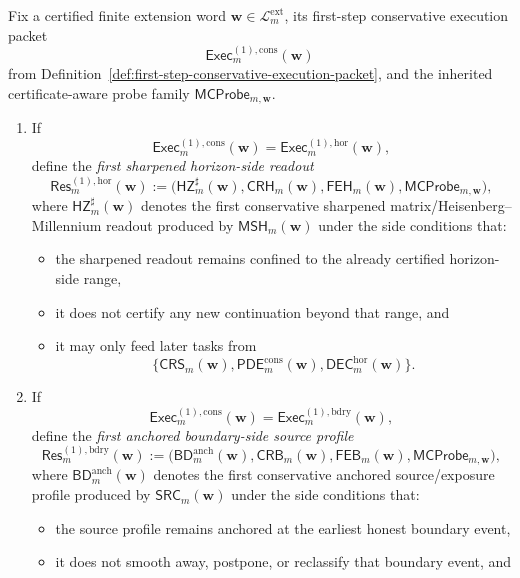 \begin{definition}
\label{def:first-conservative-result-form}
Fix a certified finite extension word \(\mathbf w\in\mathcal L^{\mathrm{ext}}_{m}\), its first-step conservative execution packet
\[
 \mathsf{Exec}^{(1),\mathrm{cons}}_{m}(\mathbf w)
\]
from Definition~\ref{def:first-step-conservative-execution-packet}, and the inherited certificate-aware probe family \(\mathsf{MCProbe}_{m,\mathbf w}\).
\begin{enumerate}[label=(\roman*)]
 \item If
 \[
 \mathsf{Exec}^{(1),\mathrm{cons}}_{m}(\mathbf w)=\mathsf{Exec}^{(1),\mathrm{hor}}_{m}(\mathbf w),
 \]
 define the \emph{first sharpened horizon-side readout}
 \[
 \mathsf{Res}^{(1),\mathrm{hor}}_{m}(\mathbf w)
 :=
 \bigl(\mathsf{HZ}^{\sharp}_{m}(\mathbf w),\mathsf{CRH}_{m}(\mathbf w),\mathsf{FEH}_{m}(\mathbf w),\mathsf{MCProbe}_{m,\mathbf w}\bigr),
 \]
 where \(\mathsf{HZ}^{\sharp}_{m}(\mathbf w)\) denotes the first conservative sharpened matrix/Heisenberg--Millennium readout produced by \(\mathsf{MSH}_{m}(\mathbf w)\) under the side conditions that:
 \begin{itemize}[leftmargin=2em]
 \item the sharpened readout remains confined to the already certified horizon-side range,
 \item it does not certify any new continuation beyond that range, and
 \item it may only feed later tasks from
 \[
 \{\mathsf{CRS}_{m}(\mathbf w),\mathsf{PDE}^{\mathrm{cons}}_{m}(\mathbf w),\mathsf{DEC}^{\mathrm{hor}}_{m}(\mathbf w)\}.
 \]
 \end{itemize}
 \item If
 \[
 \mathsf{Exec}^{(1),\mathrm{cons}}_{m}(\mathbf w)=\mathsf{Exec}^{(1),\mathrm{bdry}}_{m}(\mathbf w),
 \]
 define the \emph{first anchored boundary-side source profile}
 \[
 \mathsf{Res}^{(1),\mathrm{bdry}}_{m}(\mathbf w)
 :=
 \bigl(\mathsf{BD}^{\mathrm{anch}}_{m}(\mathbf w),\mathsf{CRB}_{m}(\mathbf w),\mathsf{FEB}_{m}(\mathbf w),\mathsf{MCProbe}_{m,\mathbf w}\bigr),
 \]
 where \(\mathsf{BD}^{\mathrm{anch}}_{m}(\mathbf w)\) denotes the first conservative anchored source/exposure profile produced by \(\mathsf{SRC}_{m}(\mathbf w)\) under the side conditions that:
 \begin{itemize}[leftmargin=2em]
 \item the source profile remains anchored at the earliest honest boundary event,
 \item it does not smooth away, postpone, or reclassify that boundary event, and

\end{itemize}
\end{enumerate}
\end{definition}
